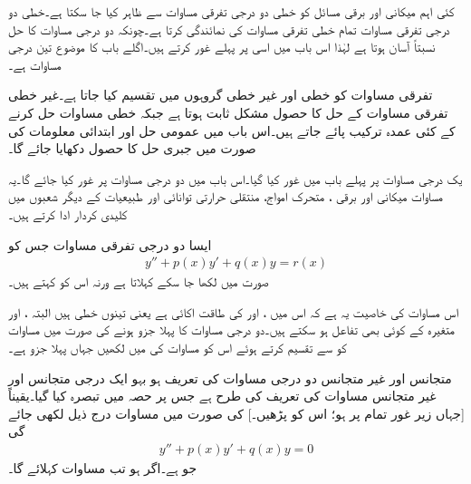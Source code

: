 کئی اہم میکانی اور برقی مسائل کو خطی دو درجی تفرقی مساوات سے ظاہر کیا جا سکتا ہے۔خطی دو درجی تفرقی مساوات  تمام خطی تفرقی مساوات کی نمائندگی کرتا ہے۔چونکہ دو درجی مساوات کا حل نسبتاً آسان ہوتا ہے لہٰذا اس باب میں اسی پر پہلے غور کرتے ہیں۔اگلے باب کا موضوع تین درجی مساوات ہے۔

تفرقی مساوات کو خطی اور غیر خطی گروہوں میں تقسیم کیا جاتا ہے۔غیر خطی تفرقی مساوات کے حل کا حصول مشکل ثابت ہوتا ہے جبکہ خطی مساوات حل کرنے کے کئی عمدہ ترکیب پائے جاتے ہیں۔اس باب میں عمومی حل اور ابتدائی معلومات کی صورت میں جبری حل کا حصول دکھایا جائے گا۔

یک درجی مساوات پر پہلے باب میں غور کیا گیا۔اس باب میں دو درجی مساوات پر غور کیا جائے گا۔یہ مساوات میکانی اور برقی ، متحرک امواج، منتقلی حرارتی توانائی اور طبیعیات کے دیگر شعبوں میں کلیدی کردار ادا کرتے ہیں۔

ایسا دو درجی تفرقی مساوات جس کو
\begin{align}\label{مساوات_سادہ_دو_درجی_تعریف}
y''+p(x)y'+q(x)y=r(x)
\end{align}
صورت میں لکھا جا سکے  کہلاتا ہے ورنہ اس کو  کہتے ہیں۔

اس مساوات کی خاصیت یہ ہے کہ اس میں ،  اور  کی طاقت اکائی ہے  یعنی تینوں خطی ہیں البتہ ،  اور  متغیرہ  کے کوئی بھی تفاعل ہو سکتے ہیں۔دو درجی مساوات کا پہلا جزو  ہونے کی صورت میں مساوات کو  سے تقسیم کرتے ہوئے اس کو مساوات  کی  میں لکھیں جہاں   پہلا  جزو ہے۔

متجانس اور غیر متجانس دو درجی مساوات کی تعریف ہو بہو ایک درجی متجانس اور غیر متجانس مساوات کی تعریف کی طرح ہے جس پر حصہ  میں تبصرہ کیا گیا۔یقیناً  [جہاں زیر غور تمام  پر   ہو؛ اس کو  پڑھیں۔] کی صورت میں مساوات  درج ذیل لکھی جائے گی 
\begin{align}\label{مساوات_سادہ_متجانس_دو_درجی_تعریف}
y''+p(x)y'+q(x)y=0
\end{align}
جو  ہے۔اگر  ہو تب مساوات   کہلائے گا۔

